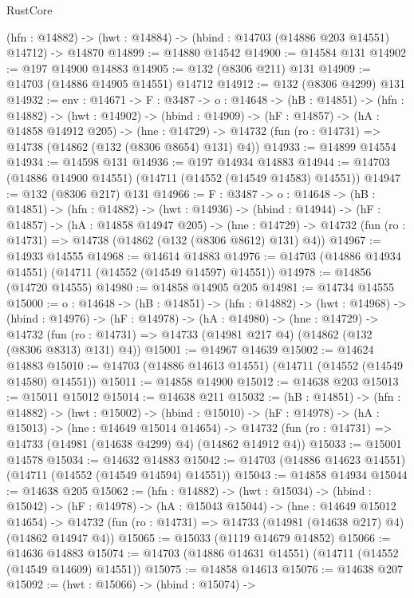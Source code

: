 \begin{lexlean}{RustCore}
\begin{coremodule}
  (hfn : @14882) -> (hwt : @14884) -> (hbind : @14703 (@14886 @203 @14551) @14712) -> @14870
@14899 := @14880 @14542
@14900 := @14584 @131
@14902 := @197 @14900 @14883
@14905 := @132 (@8306 @211) @131
@14909 := @14703 (@14886 @14905 @14551) @14712
@14912 := @132 (@8306 @4299) @131
@14932 := {env : @14671} ->
  {F : @3487} ->
  {o : @14648} ->
  (hB : @14851) ->
  (hfn : @14882) ->
  (hwt : @14902) ->
  (hbind : @14909) ->
  (hF : @14857) ->
  (hA : @14858 @14912 @205) ->
  (hne : @14729) -> @14732 (fun (ro : @14731) => @14738 (@14862 (@132 (@8306 @8654) @131) @4))
@14933 := @14899 @14554
@14934 := @14598 @131
@14936 := @197 @14934 @14883
@14944 := @14703 (@14886 @14900 @14551) (@14711 (@14552 (@14549 @14583) @14551))
@14947 := @132 (@8306 @217) @131
@14966 := {F : @3487} ->
  {o : @14648} ->
  (hB : @14851) ->
  (hfn : @14882) ->
  (hwt : @14936) ->
  (hbind : @14944) ->
  (hF : @14857) ->
  (hA : @14858 @14947 @205) ->
  (hne : @14729) -> @14732 (fun (ro : @14731) => @14738 (@14862 (@132 (@8306 @8612) @131) @4))
@14967 := @14933 @14555
@14968 := @14614 @14883
@14976 := @14703 (@14886 @14934 @14551) (@14711 (@14552 (@14549 @14597) @14551))
@14978 := @14856 (@14720 @14555)
@14980 := @14858 @14905 @205
@14981 := @14734 @14555
@15000 := {o : @14648} ->
  (hB : @14851) ->
  (hfn : @14882) ->
  (hwt : @14968) ->
  (hbind : @14976) ->
  (hF : @14978) ->
  (hA : @14980) ->
  (hne : @14729) ->
  @14732 (fun (ro : @14731) => @14733 (@14981 @217 @4) (@14862 (@132 (@8306 @8313) @131) @4))
@15001 := @14967 @14639
@15002 := @14624 @14883
@15010 := @14703 (@14886 @14613 @14551) (@14711 (@14552 (@14549 @14580) @14551))
@15011 := @14858 @14900
@15012 := @14638 @203
@15013 := @15011 @15012
@15014 := @14638 @211
@15032 := (hB : @14851) ->
  (hfn : @14882) ->
  (hwt : @15002) ->
  (hbind : @15010) ->
  (hF : @14978) ->
  (hA : @15013) ->
  (hne : @14649 @15014 @14654) ->
  @14732 (fun (ro : @14731) => @14733 (@14981 (@14638 @4299) @4) (@14862 @14912 @4))
@15033 := @15001 @14578
@15034 := @14632 @14883
@15042 := @14703 (@14886 @14623 @14551) (@14711 (@14552 (@14549 @14594) @14551))
@15043 := @14858 @14934
@15044 := @14638 @205
@15062 := (hfn : @14882) ->
  (hwt : @15034) ->
  (hbind : @15042) ->
  (hF : @14978) ->
  (hA : @15043 @15044) ->
  (hne : @14649 @15012 @14654) ->
  @14732 (fun (ro : @14731) => @14733 (@14981 (@14638 @217) @4) (@14862 @14947 @4))
@15065 := @15033 (@1119 @14679 @14852)
@15066 := @14636 @14883
@15074 := @14703 (@14886 @14631 @14551) (@14711 (@14552 (@14549 @14609) @14551))
@15075 := @14858 @14613
@15076 := @14638 @207
@15092 := (hwt : @15066) ->
  (hbind : @15074) ->

\end{coremodule}
\end{lexlean}
